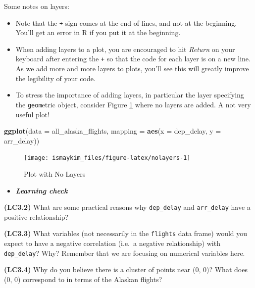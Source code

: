 \documentclass[12pt,]{krantz}
\makeatletter
\newenvironment{Shaded}{\begin{snugshade}}{\end{snugshade}}
\newcommand{\KeywordTok}[1]{\textcolor[rgb]{0.27,0.27,0.27}{\textbf{#1}}}
\newcommand{\DataTypeTok}[1]{\textcolor[rgb]{0.27,0.27,0.27}{#1}}
\newcommand{\NormalTok}[1]{#1}
\providecommand{\tightlist}{%
  \setlength{\itemsep}{0pt}\setlength{\parskip}{0pt}}
\newenvironment{kframe}{%
\medskip{}
\setlength{\fboxsep}{.8em}
 \def\at@end@of@kframe{}%
 \ifinner\ifhmode%
  \def\at@end@of@kframe{\end{minipage}}%
  \begin{minipage}{\columnwidth}%
 \fi\fi%
 \def\FrameCommand##1{\hskip\@totalleftmargin \hskip-\fboxsep
 \colorbox{shadecolor}{##1}\hskip-\fboxsep
     \hskip-\linewidth \hskip-\@totalleftmargin \hskip\columnwidth}%
 \MakeFramed {\advance\hsize-\width
   \@totalleftmargin\z@ \linewidth\hsize
   \@setminipage}}%
 {\par\unskip\endMakeFramed%
 \at@end@of@kframe}
\renewenvironment{Shaded}{\begin{kframe}}{\end{kframe}}
\newenvironment{rmdblock}[1]
  {\begin{shaded*}
  \begin{itemize}
  \renewcommand{\labelitemi}{
    \raisebox{-.7\height}[0pt][0pt]{
    }
  }
  \item
  }
  {
  \end{itemize}
  \end{shaded*}
  }
\newenvironment{learncheck}
  {\begin{rmdblock}{warning}}
  {\end{rmdblock}}
\theoremstyle{definition}
\theoremstyle{definition}
\theoremstyle{definition}
\theoremstyle{remark}
\makeatother
\begin{document}
Some notes on layers:

\begin{itemize}
\tightlist
\item
  Note that the \texttt{+} sign comes at the end of lines, and not at
  the beginning. You'll get an error in R if you put it at the
  beginning.
\item
  When adding layers to a plot, you are encouraged to hit \emph{Return}
  on your keyboard after entering the \texttt{+} so that the code for
  each layer is on a new line. As we add more and more layers to plots,
  you'll see this will greatly improve the legibility of your code.
\item
  To stress the importance of adding layers, in particular the layer
  specifying the \texttt{geom}etric object, consider Figure
  \ref{fig:nolayers} where no layers are added. A not very useful plot!
\end{itemize}

\begin{Shaded}
\begin{Highlighting}[]
\KeywordTok{ggplot}\NormalTok{(}\DataTypeTok{data =}\NormalTok{ all_alaska_flights, }
       \DataTypeTok{mapping =} \KeywordTok{aes}\NormalTok{(}\DataTypeTok{x =}\NormalTok{ dep_delay, }\DataTypeTok{y =}\NormalTok{ arr_delay))}
\end{Highlighting}
\end{Shaded}

\begin{figure}

{\centering \texttt{[image: ismaykim\_files/figure-latex/nolayers-1]} 

}

\caption{Plot with No Layers}\label{fig:nolayers}
\end{figure}

\begin{learncheck}
\textbf{\emph{Learning check}}
\end{learncheck}

\textbf{(LC3.2)} What are some practical reasons why \texttt{dep\_delay}
and \texttt{arr\_delay} have a positive relationship?

\textbf{(LC3.3)} What variables (not necessarily in the \texttt{flights}
data frame) would you expect to have a negative correlation (i.e.~a
negative relationship) with \texttt{dep\_delay}? Why? Remember that we
are focusing on numerical variables here.

\textbf{(LC3.4)} Why do you believe there is a cluster of points near
(0, 0)? What does (0, 0) correspond to in terms of the Alaskan flights?
\end{document}
